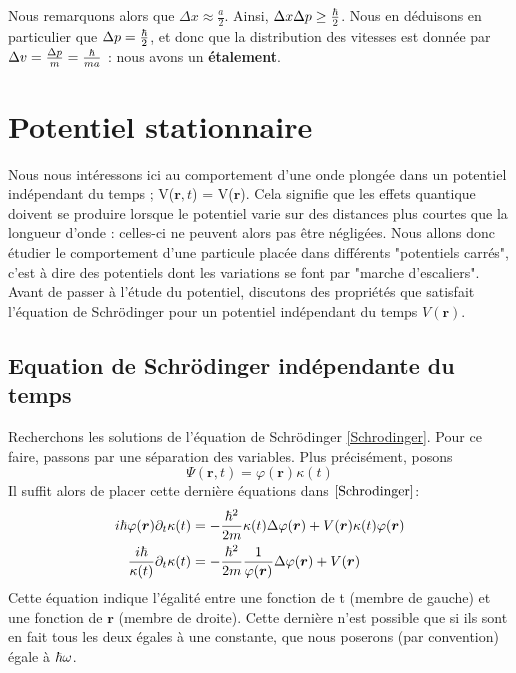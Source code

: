 \documentclass[../notesdecours]{subfiles}
\begin{document}

Nous remarquons alors que $\Delta x \approx \frac{a}{2}$. Ainsi, $\Delta x\Delta p \geq \frac{\hbar}{2}$. Nous en déduisons en particulier que $\Delta p = \frac{\hbar}{2}$, et donc que la distribution des vitesses est donnée par $\Delta v = \frac{\Delta p}{m} = \frac{\hbar}{ma}$ : nous avons un \textbf{étalement}.

\newpage
\section{Potentiel stationnaire}
Nous nous intéressons ici au comportement d'une onde plongée dans un potentiel indépendant du temps ; V($\bm{r},t$) = V($\bm{r}$). Cela signifie que les effets quantique doivent se produire lorsque le potentiel varie sur des distances plus courtes que la longueur d'onde : celles-ci ne peuvent alors pas être négligées.  Nous allons donc étudier le comportement d'une particule placée dans différents "potentiels carrés", c'est à dire des potentiels dont les variations se font par "marche d'escaliers". Avant de passer à l'étude du potentiel, discutons des propriétés que satisfait l'équation de Schrödinger pour un potentiel indépendant du temps $V(\bm{r})$.\\

\subsection{Equation de Schrödinger indépendante du temps}

Recherchons les solutions de l'équation de Schrödinger \eqref{Schrodinger}. Pour ce faire, passons par une séparation des variables. Plus précisément, posons
\begin{equation}
\Psi(\bm{r},t) = \varphi(\bm{r})\kappa(t)
\end{equation}
Il suffit alors de placer cette dernière équations dans $\eqref{Schrodinger}$:
\begin{align}
i \hbar \varphi(\bm{r})\partial_t \kappa(t) &= - \frac{\hbar^2}{2m} \kappa(t) \Delta \varphi(\bm{r}) + V(\bm{r})\kappa(t)\varphi(\bm{r})\\
\frac{i\hbar}{\kappa(t)} \partial_t \kappa(t) &= - \frac{\hbar^2}{2m} \frac{1}{\varphi(\bm{r})} \Delta \varphi(\bm{r}) + V(\bm{r})
\label{Séparation temporelle et spatiale}
\end{align}
Cette équation indique l'égalité entre une fonction de t (membre de gauche) et une fonction de $\bm{r}$ (membre de droite). Cette dernière n'est possible que si ils sont en fait tous les deux égales à une constante, que nous poserons (par convention) égale à $\hbar \omega$.\\
\end{document}
